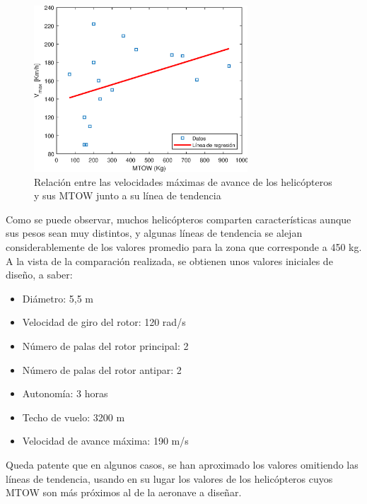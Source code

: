 \begin{figure}
	\centering
	\includegraphics[width=80mm]{graficos/analv}
	\caption{Relación entre las velocidades máximas de avance de los helicópteros y sus MTOW junto a su línea de tendencia}
\end{figure}

Como se puede observar, muchos helicópteros comparten características aunque sus pesos sean muy distintos, y algunas líneas de tendencia se alejan considerablemente de los valores promedio para la zona que corresponde a 450 kg. A la vista de la comparación realizada, se obtienen unos valores iniciales de diseño, a saber:

\begin{itemize}
	\item Diámetro: 5,5 m
	\item Velocidad de giro del rotor: 120 rad/s
	\item Número de palas del rotor principal: 2
	\item Número de palas del rotor antipar: 2
	\item Autonomía: 3 horas
	\item Techo de vuelo: 3200 m
	\item Velocidad de avance máxima: 190 m/s
\end{itemize}

Queda patente que en algunos casos, se han aproximado los valores omitiendo las líneas de tendencia, usando en su lugar los valores de los helicópteros cuyos MTOW son más próximos al de la aeronave a diseñar.